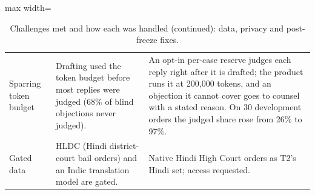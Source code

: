 \begin{table}[!t]
\begin{adjustbox}{max width=\textwidth}
\begin{tabular}{@{}p{4.6cm}p{5.4cm}p{5.2cm}@{}}
Sparring token budget & Drafting used the token budget before most replies were judged (68\% of blind objections never judged). & An opt-in per-case reserve judges each reply right after it is drafted; the product runs it at 200{,}000 tokens, and an objection it cannot cover goes to counsel with a stated reason. On 30 development orders the judged share rose from 26\% to 97\%. \\
Gated data & HLDC (Hindi district-court bail orders) and an Indic translation model are gated. & Native Hindi High Court orders as T2's Hindi set; access requested. \\
\bottomrule
\end{tabular}
\end{adjustbox}
\caption{Challenges met and how each was handled (continued): data, privacy and post-freeze fixes.}
\label{tab:challenges2}
\end{table}
